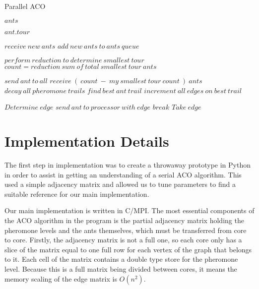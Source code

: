 \documentclass{acm_proc_article-sp}
\begin{document}
\caption{Parallel ACO}
\begin{algorithmic}[1]

        \State $ants$
            
            
                    \State $ ant.tour $
                \EndFor
                
                \State $receive\ new\ ants $
                \State $add\ new\ ants\ to\ ants\ queue $
            
            \EndWhile
            
                \State $perform\ reduction\ to\ determine\ smallest\ tour $
                \State $count = reduction\ sum\ of\ total\ smallest\ tour\ ants $
                
                    \State $send\ ant\ to\ all $
                \EndIf
                \State $ receive\ (\ count\ -\ my\ smallest\ tour\ count\ )\ ants $
                \State $ decay\ all\ pheromone\ trails $
                \State $ find\ best\ ant\ trail $
                \State $ increment\ all\ edges\ on\ best\ trail $
    
        \EndWhile
    \EndProcedure
    
            \State $Determine\ edge$
                \State $send\ ant\ to\ processor\ with\ edge$
                \State $break$
            \EndIf
            \State $Take\ edge$
        \EndWhile
    \EndProcedure
    
\end{algorithmic}

\section{Implementation Details}
The first step in implementation was to create a throwaway prototype in Python
in order to assist in getting an understanding of a serial ACO algorithm. This
used a simple adjacency matrix and allowed us to tune parameters to find a
suitable reference for our main implementation. 

Our main implementation is written in C/MPI. The most essential components of
the ACO algorithm in the program is the partial adjacency matrix holding the
pheromone levels and the ants themselves, which must be transferred from core to
core. Firstly, the adjacency matrix is not a full one, so each core only has a
slice of the matrix equal to one full row for each vertex of the graph that
belongs to it. Each cell of the matrix contains a double type store for the
pheromone level. Because this is a full matrix being divided between cores, it
means the memory scaling of the edge matrix is $O(n^2)$.
\end{document}
